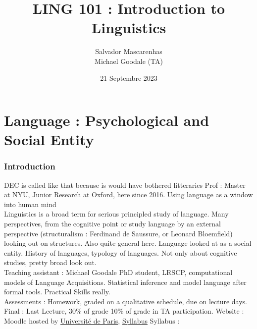 \documentclass{cours}
\title{LING 101 : Introduction to Linguistics}
\author{Salvador Mascarenhas \\ \small Michael Goodale (TA)}
\date{21 Septembre 2023}
\begin{document}
\part[Cours 1 21/09]{Language : Psychological and Social Entity}
\section*{Introduction}
    DEC is called like that because is would have bothered litteraries
    Prof : Master at NYU, Junior Research at Oxford, here since 2016. 
    Using language as a window into human mind\\
    Linguistics is a broad term for serious principled study of language. 
    Many perspectives, from the cognitive point or study language by an external perspective (structuralism : Ferdinand de Saussure, or Leonard Bloemfield) looking out on structures.
    Also quite general here.
    Language looked at as a social entity.
    History of languages, typology of languages.
    Not only about cognitive studies, pretty broad look out.\\
    Teaching assistant : Michael Goodale PhD student, LRSCP, computational models of Language Acquisitions. Statistical inference and model language after formal tools.
    Practical Skills really.\\
    Assessments : Homework, graded on a qualitative schedule, due on lecture days.
    Final : Last Lecture, 30\% of grade
    10\% of grade in TA participation. 
    Website : Moodle hosted by \href{https://moodle.u-paris.fr/course/view.php?id=7374}{Université de Paris}, \href{https://moodle.u-paris.fr/pluginfile.php/1002151/mod_resource/content/5/intro-ling-syllabus-2023.pdf}{Syllabus}
    Syllabus : 
\end{document}
